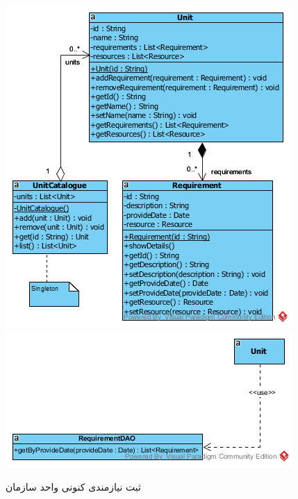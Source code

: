 \begin{landscape}
\begin{figure}[H]
	\centering
	\includegraphics[scale=0.7]{img/sequence-design/AddRequirementToUnitC}
	\includegraphics[scale=0.7]{img/sequence-design/AddRequirementToUnitD}
	\caption{ثبت نیازمندی کنونی واحد سازمان}
\end{figure}


\newpage

\end{landscape}
